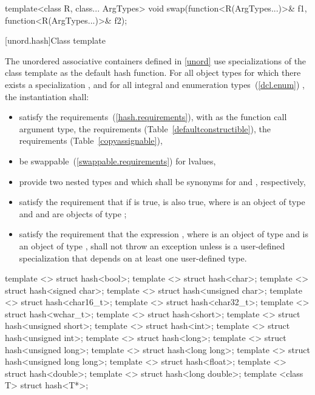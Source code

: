 %
%
\begin{itemdecl}
template<class R, class... ArgTypes>
  void swap(function<R(ArgTypes...)>& f1, function<R(ArgTypes...)>& f2);
\end{itemdecl}

\begin{itemdescr}
\pnum\effects {}
\end{itemdescr}%

[unord.hash]{Class template }

\pnum
{}%
%
The unordered associative containers defined in \ref{unord} use
specializations of the class template  as the default hash function.
For all object types  for which there exists a specialization ,
and for all integral and enumeration types~(\ref{dcl.enum}) ,
the instantiation  shall:

\begin{itemize}
\item satisfy the  requirements~(\ref{hash.requirements}),
with  as the function
call argument type, the  requirements (Table~\ref{defaultconstructible}),
the  requirements (Table~\ref{copyassignable}),
\item be swappable~(\ref{swappable.requirements}) for lvalues,
\item provide two nested types  and  which shall be
synonyms for  and , respectively,
\item satisfy the requirement that if  is true,  is
also true, where  is an object of type  and  and 
are objects of type ;
\item satisfy the requirement that the expression , where 
is an object of type  and  is an object of type
, shall not throw an exception unless  is a
user-defined specialization that depends on at least one user-defined type.
\end{itemize}

%
\begin{itemdecl}
template <> struct hash<bool>;
template <> struct hash<char>;
template <> struct hash<signed char>;
template <> struct hash<unsigned char>;
template <> struct hash<char16_t>;
template <> struct hash<char32_t>;
template <> struct hash<wchar_t>;
template <> struct hash<short>;
template <> struct hash<unsigned short>;
template <> struct hash<int>;
template <> struct hash<unsigned int>;
template <> struct hash<long>;
template <> struct hash<unsigned long>;
template <> struct hash<long long>;
template <> struct hash<unsigned long long>;
template <> struct hash<float>;
template <> struct hash<double>;
template <> struct hash<long double>;
template <class T> struct hash<T*>;
\end{itemdecl}

